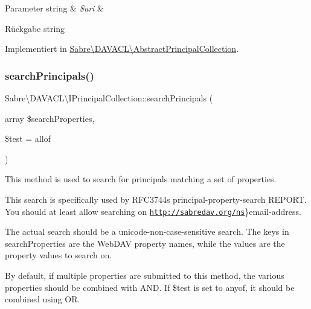 \begin{DoxyParams}[1]{Parameter}
string & {\em \$uri} & \\
\hline
\end{DoxyParams}
\begin{DoxyReturn}{Rückgabe}
string 
\end{DoxyReturn}


Implementiert in \mbox{\hyperlink{class_sabre_1_1_d_a_v_a_c_l_1_1_abstract_principal_collection_aea345cf559cc83b45134fea498854293}{Sabre\textbackslash{}\+D\+A\+V\+A\+C\+L\textbackslash{}\+Abstract\+Principal\+Collection}}.

\mbox{\label{interface_sabre_1_1_d_a_v_a_c_l_1_1_i_principal_collection_a83dd9fdd55c446e8cc9fad302095f463}} 
\subsubsection{\texorpdfstring{search\+Principals()}{searchPrincipals()}}
{\footnotesize\ttfamily Sabre\textbackslash{}\+D\+A\+V\+A\+C\+L\textbackslash{}\+I\+Principal\+Collection\+::search\+Principals (\begin{DoxyParamCaption}\item[{array}]{\$search\+Properties,  }\item[{}]{\$test = {\ttfamily \textquotesingle{}allof\textquotesingle{}} }\end{DoxyParamCaption})}

This method is used to search for principals matching a set of properties.

This search is specifically used by R\+F\+C3744\textquotesingle{}s principal-\/property-\/search R\+E\+P\+O\+RT. You should at least allow searching on \href{http://sabredav.org/ns}{\tt http\+://sabredav.\+org/ns}\}email-\/address.

The actual search should be a unicode-\/non-\/case-\/sensitive search. The keys in search\+Properties are the Web\+D\+AV property names, while the values are the property values to search on.

By default, if multiple properties are submitted to this method, the various properties should be combined with \textquotesingle{}A\+ND\textquotesingle{}. If \$test is set to \textquotesingle{}anyof\textquotesingle{}, it should be combined using \textquotesingle{}OR\textquotesingle{}.

